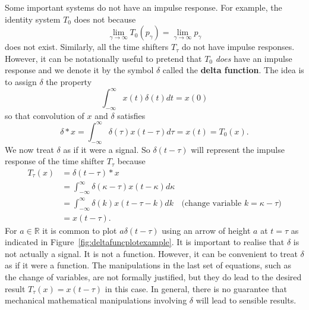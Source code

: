 \documentclass[11pt,a4paper]{book}
\theoremstyle{plain}
\numberwithin{equation}{section}
\newcommand{\reals}{{\mathbb R}}
\newcommand{\term}{\textbf}
\begin{document}
Some important systems do not have an impulse response.  For example, the identity system $T_0$ does not because
\[
\lim_{\gamma \rightarrow \infty} T_0(p_\gamma) = \lim_{\gamma \rightarrow \infty} p_\gamma
\]
does not exist.  %
Similarly, all the time shifters $T_\tau$ do not have impulse responses.  However, it can be notationally useful to pretend that $T_0$ \emph{does} have an impulse response and we denote it by the symbol $\delta$ called the \term{delta function}.  The idea is to assign $\delta$ the property
\[
\int_{-\infty}^\infty x(t) \delta(t) dt = x(0) %
\]
so that convolution of $x$ and $\delta$ satisfies
\[
\delta * x = \int_{-\infty}^{\infty} \delta(\tau) x(t - \tau) d\tau = x(t) = T_0(x).
\]
We now treat $\delta$ as if it were a signal.  So $\delta(t - \tau)$ will represent the impulse response of the time shifter $T_\tau$ because
\begin{align*}
T_\tau(x) &= \delta(t - \tau) * x \\
&= \int_{-\infty}^{\infty} \delta(\kappa -\tau) x(t - \kappa) d\kappa \\
&= \int_{-\infty}^{\infty} \delta(k) x(t - \tau - k) dk & \text{(change variable $k = \kappa - \tau$)}\\
&= x(t-\tau).
\end{align*}
For $a\in \reals$ it is common to plot $a\delta(t - \tau)$ using an arrow of height $a$ at $t = \tau$ as indicated in Figure~\ref{fig:deltafuncplotexample}.  It is important to realise that $\delta$ is not actually a signal.  It is not a function.  However, it can be convenient to treat $\delta$ as if it were a function.  The manipulations in the last set of equations, such as the change of variables, are not formally justified, but they do lead to the desired result $T_\tau(x) = x(t-\tau)$ in this case.  In general, there is no guarantee that mechanical mathematical manipulations involving $\delta$ will lead to sensible results.
\end{document}
